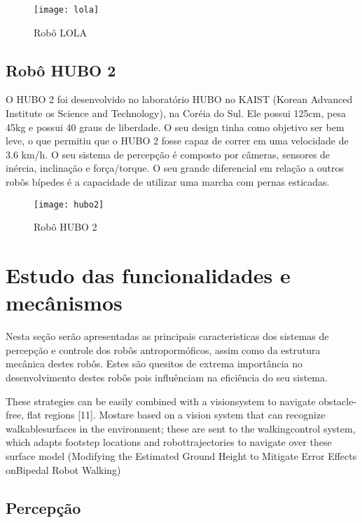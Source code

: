 \begin{figure} [H]
    \centering
    \caption{Robô LOLA}
    \texttt{[image: lola]}
    \label{fig:lola}
\end{figure}

\subsection{Robô HUBO 2}
\label{ssec:hubo}

O HUBO 2 foi desenvolvido no laboratório HUBO no KAIST (Korean Advanced Institute os Science and Technology), na Coréia do Sul. Ele possui 125cm, pesa 45kg e possui 40 graus de liberdade. O seu design tinha como objetivo ser bem leve, o que permitiu que o HUBO 2 fosse capaz de correr em uma velocidade de 3.6 km/h. O seu sistema de percepção é composto por câmeras, sensores de inércia, inclinação e  força/torque. O seu grande diferencial em relação a outros robôs bípedes é a capacidade de utilizar uma marcha com pernas esticadas.

\begin{figure} [H]
    \centering
    \caption{Robô HUBO 2}
    \texttt{[image: hubo2]}
    \label{fig:hubo2}
\end{figure}


\section{Estudo das funcionalidades e mecânismos}
\label{sec:robos}

Nesta seção serão apresentadas as principais caracteristicas dos sistemas de percepção e controle dos robôs antropormóficos, assim como da estrutura mecânica destes robôs. Estes são quesitos de extrema importância no desenvolvimento destes robôs pois influênciam na eficiência do seu sistema.

These strategies can be easily combined with a visionsystem  to  navigate  obstacle-free,  flat  regions  [11].  Mostare  based  on  a  vision  system  that  can  recognize  walkablesurfaces  in  the  environment;  these  are  sent  to  the  walkingcontrol  system,  which  adapts  footstep  locations  and  robottrajectories to navigate over these surface model (Modifying the Estimated Ground Height to Mitigate Error Effects onBipedal Robot Walking)

\subsection{Percepção}
\label{ssec:percepcao}

